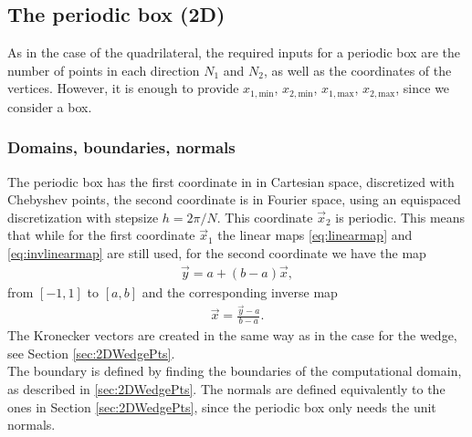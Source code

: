 \subsection{The periodic box (2D)}
As in the case of the quadrilateral, the required inputs for a periodic box are the number of points in each direction $N_1$ and $N_2$, as well as the coordinates of the vertices. However, it is enough to provide $x_{1,\text{min}}$, $x_{2,\text{min}}$, $x_{1,\text{max}}$, $x_{2,\text{max}}$, since we consider a box.

\subsubsection{Domains, boundaries, normals}
The periodic box has the first coordinate in in Cartesian space, discretized with Chebyshev points, the second coordinate is in Fourier space, using an equispaced discretization with stepsize $h = 2\pi /N$. This coordinate $\vec x_2$ is periodic. 
This means that while for the first coordinate $\vec x_1$ the linear maps \eqref{eq:linearmap} and \eqref{eq:invlinearmap} are still used, for the second coordinate we have the map 
\begin{align*}
	\vec y = a + (b-a) \vec x, 
\end{align*}
from $[-1,1]$ to $[a,b]$ and the corresponding inverse map
\begin{align*}
   \vec x = \frac{\vec y- a}{b-a}.
\end{align*}
The Kronecker vectors are created in the same way as in the case for the wedge, see Section \ref{sec:2DWedgePts}.
\\
The boundary is defined by finding the boundaries of the computational domain, as described in \ref{sec:2DWedgePts}. The normals are defined equivalently to the ones in Section \ref{sec:2DWedgePts}, since the periodic box only needs the unit normals.

